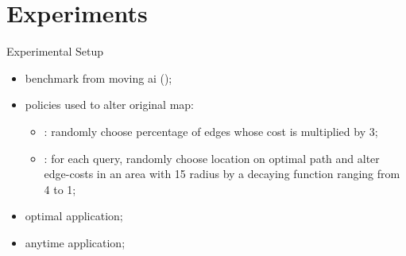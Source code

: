 \section*{Experiments}

\begin{frame}{Experimental Setup}
    
    \begin{itemize}
        \item benchmark from moving ai ();
        \item policies used to alter original map:
            \begin{itemize}
                \item {}: randomly choose percentage of edges whose cost is multiplied by 3;
                \item {}: for each query, randomly choose location on optimal path and alter edge-costs in an area with 15 radius by a decaying function ranging from 4 to 1;
            \end{itemize}
        \item optimal application;
        \item anytime application;
    \end{itemize}
\end{frame}

